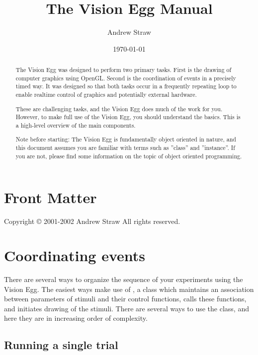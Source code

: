 \documentclass{manual}
\title{The Vision Egg Manual}
\author{Andrew Straw}
\date{\today}			%
\begin{document}
\maketitle

\ifhtml
\chapter*{Front Matter\label{front}}
\fi

Copyright \copyright{} 2001-2002 Andrew Straw
All rights reserved.

\begin{abstract}

\noindent
The Vision Egg was designed to perform two primary tasks.  First is
the drawing of computer graphics using OpenGL.  Second is the
coordination of events in a precisely timed way.  It was designed so
that both tasks occur in a frequently repeating loop to enable
realtime control of graphics and potentially external hardware.

These are challenging tasks, and the Vision Egg does much of the work
for you. However, to make full use of the Vision Egg, you should
understand the basics.  This is a high-level overview of the main
components.

Note before starting: The Vision Egg is fundamentally object oriented
in nature, and this document assumes you are familiar with terms such
as ''class'' and ''instance''.  If you are not, please find some
information on the topic of object oriented programming.
\end{abstract}

\tableofcontents

\chapter{Coordinating events \label{coordinating events}}

There are several ways to organize the sequence of your experiments
using the Vision Egg.  The easiest ways make use of
, a class which maintains an association between
parameters of stimuli and their control functions, calls these
functions, and initiates drawing of the stimuli.  There are several
ways to use the  class, and here they are in
increasing order of complexity.

\section{Running a single trial}
\end{document}
